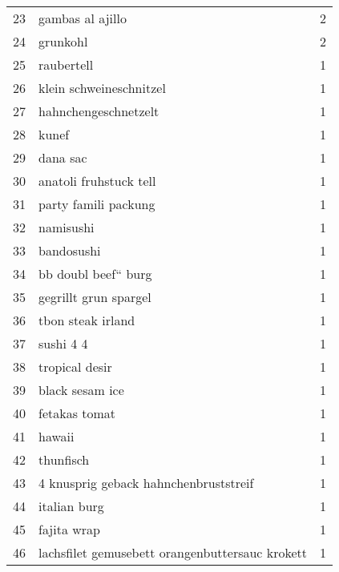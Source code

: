 \begin{tabular}{llr}
23  &                                   gambas al ajillo &      2 \\
24  &                                           grunkohl &      2 \\
25  &                                         raubertell &      1 \\
26  &                            klein schweineschnitzel &      1 \\
27  &                               hahnchengeschnetzelt &      1 \\
28  &                                              kunef &      1 \\
29  &                                           dana sac &      1 \\
30  &                             anatoli fruhstuck tell &      1 \\
31  &                               party famili packung &      1 \\
32  &                                          namisushi &      1 \\
33  &                                         bandosushi &      1 \\
34  &                                bb doubl beef“ burg &      1 \\
35  &                              gegrillt grun spargel &      1 \\
36  &                                  tbon steak irland &      1 \\
37  &                                          sushi 4 4 &      1 \\
38  &                                     tropical desir &      1 \\
39  &                                    black sesam ice &      1 \\
40  &                                      fetakas tomat &      1 \\
41  &                                             hawaii &      1 \\
42  &                                          thunfisch &      1 \\
43  &              4 knusprig geback hahnchenbruststreif &      1 \\
44  &                                       italian burg &      1 \\
45  &                                        fajita wrap &      1 \\
46  &    lachsfilet gemusebett orangenbuttersauc krokett &      1 \\

\end{tabular}

